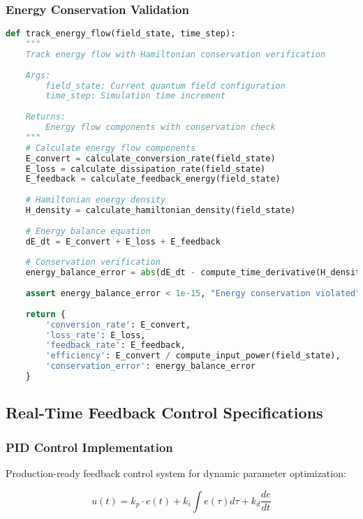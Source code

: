 \documentclass[11pt]{article}
\begin{document}
\subsubsection{Energy Conservation Validation}
\begin{lstlisting}[language=Python, caption=Energy Flow Tracking Implementation]
def track_energy_flow(field_state, time_step):
    """
    Track energy flow with Hamiltonian conservation verification
    
    Args:
        field_state: Current quantum field configuration
        time_step: Simulation time increment
        
    Returns:
        Energy flow components with conservation check
    """
    # Calculate energy flow components
    E_convert = calculate_conversion_rate(field_state)
    E_loss = calculate_dissipation_rate(field_state)
    E_feedback = calculate_feedback_energy(field_state)
    
    # Hamiltonian energy density
    H_density = calculate_hamiltonian_density(field_state)
    
    # Energy balance equation
    dE_dt = E_convert + E_loss + E_feedback
    
    # Conservation verification
    energy_balance_error = abs(dE_dt - compute_time_derivative(H_density))
    
    assert energy_balance_error < 1e-15, "Energy conservation violated"
    
    return {
        'conversion_rate': E_convert,
        'loss_rate': E_loss,
        'feedback_rate': E_feedback,
        'efficiency': E_convert / compute_input_power(field_state),
        'conservation_error': energy_balance_error
    }
\end{lstlisting}

\subsection{Real-Time Feedback Control Specifications}

\subsubsection{PID Control Implementation}
Production-ready feedback control system for dynamic parameter optimization:

\begin{equation}
u(t) = k_p \cdot e(t) + k_i \int e(\tau)d\tau + k_d \frac{de}{dt}
\end{equation}
\end{document}
